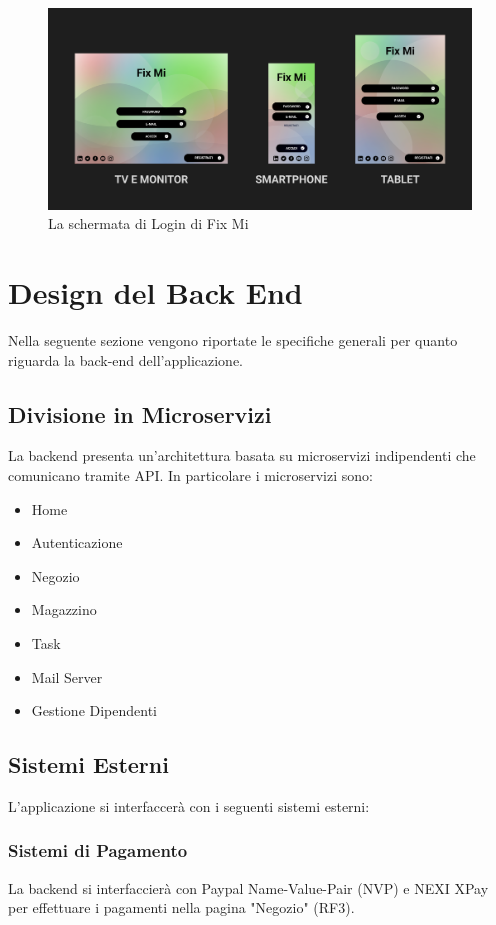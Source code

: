 \documentclass{report}
\begin{document}
\begin{figure}[h]
	\centering
	\includegraphics[width=1\textwidth]{images/login_snapshot}
	\caption{La schermata di Login di Fix Mi}
\end{figure}	


\section{Design del Back End}

Nella seguente sezione vengono riportate le specifiche generali per quanto riguarda la back-end dell’applicazione.

\subsection{Divisione in Microservizi}

La backend presenta un’architettura basata su microservizi indipendenti che comunicano tramite API. In particolare i microservizi sono:
\begin{itemize}
	\item Home
	\item Autenticazione
	\item Negozio
	\item Magazzino
	\item Task
	\item Mail Server
	\item Gestione Dipendenti
\end{itemize}

\subsection{Sistemi Esterni}
L’applicazione si interfaccerà con i seguenti sistemi esterni:

\subsubsection{Sistemi di Pagamento}
La backend si interfaccierà con Paypal Name-Value-Pair (NVP) e NEXI XPay per effettuare i pagamenti nella pagina "Negozio" (RF3). 
\end{document}
